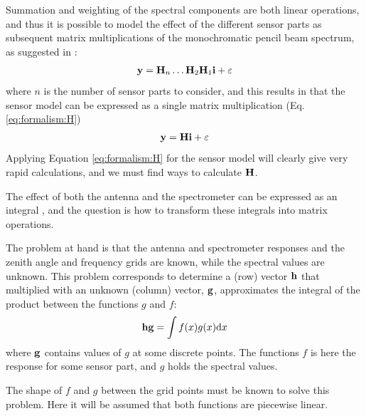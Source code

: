  Summation and weighting of the spectral components are both linear
 operations, and thus it is possible to model the effect of the
 different sensor parts as subsequent matrix multiplications of the
 monochromatic pencil beam spectrum, as suggested in \citet{eriksson:00a}:
 \begin{eqnarray}
   \mathbf{y} = \mathbf{H}_n\dots\mathbf{H}_2\mathbf{H}_1\mathbf{i} + \varepsilon
 \end{eqnarray}
 where $n$ is the number of sensor parts to consider, and this results
 in that the sensor model can be expressed as a single matrix
 multiplication (Eq. \ref{eq:formalism:H})
 \begin{eqnarray}
   \mathbf{y} = \mathbf{H}\mathbf{i} + \varepsilon                     \nonumber
 \end{eqnarray}
 Applying Equation \ref{eq:formalism:H} for the sensor model will
 clearly give very rapid calculations, and we must find ways to
 calculate $\mathbf{H}$.



 \label{sec:sensor:integr}
  
 The effect of both the antenna and the spectrometer can be expressed
 as an integral \citep[e.g.][Eq. 86 and 94]{eriksson:97a}, and the
 question is how to transform these integrals into matrix operations.
  
 The problem at hand is that the antenna and spectrometer responses
 and the zenith angle and frequency grids are known, while the spectral
 values are unknown. This problem corresponds to determine a (row)
 vector $\mathbf{h}$ that multiplied with an unknown (column) vector,
 $\mathbf{g}$, approximates the integral of the product between the
 functions $g$ and $f$:
 \begin{equation} 
   \mathbf{hg} = \int{f(x)g(x) \ensuremath{\mathrm{d}}x}
   \label{eq:sensor:integral_problem}
 \end{equation}
 where $\mathbf{g}$ contains values of $g$ at some discrete points. The
 functions $f$ is here the response for some sensor part, and $g$
 holds the spectral values.
 
 The shape of $f$ and $g$ between the grid points must be known to
 solve this problem. Here it will be assumed that both functions are
 piecewise linear.
  
